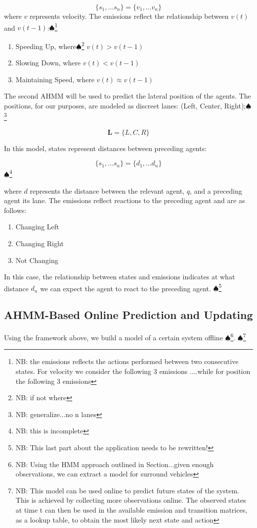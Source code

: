 \documentclass[letterpaper, 10 pt, conference]{ieeeconf}  %
\newcommand\NB[1]{$\spadesuit$\footnote{NB: #1}}
\begin{document}
\begin{equation}
\{s_1,\ldots s_n\} = \{v_1,\ldots v_n\}
\end{equation}
    where $v$ represents velocity. The emissions reflect the relationship between $v(t)$ and $v(t-1)$:\NB{the emissions reflects the actions performed between two consecutive states. For velocity we consider the following 3 emissions ....while for position the following 3 emissions }

\begin{enumerate}
    \item Speeding Up, where\NB{if not where} $v(t) > v(t-1)$
    \item Slowing Down, where $v(t) < v(t-1)$
    \item Maintaining Speed, where $v(t) \approx v(t-1)$
\end{enumerate}

The second AHMM will be used to predict the lateral position of the agents. The positions, for our purposes, are modeled as discreet lanes: (Left, Center, Right);\NB{generalize...no n lanes}

\begin{equation}
    \mathbf{L} = \{L,C,R\}
\end{equation}

In this model, states represent distances between preceding agents:

\begin{equation}
\{s_1,\ldots s_n\} = \{d_1,\ldots d_n\}
\end{equation}
\NB{this is incomplete}

where $d$ represents the distance between the relevant agent, $q$, and a preceding agent its lane. The emissions reflect reactions to the preceding agent and are as follows:
\begin{enumerate}
    \item Changing Left
    \item Changing Right
    \item Not Changing
\end{enumerate}
In this case, the relationship between states and emissions indicates at what distance $d_n$ we can expect the agent to react to the preceding agent.
\NB{This last part about the application needs to be rewritten!}

\subsection{AHMM-Based Online Prediction and Updating} \label{sec:ahmmpredupdate} %
 Using the framework above, we build a model of a certain system offline \NB{Using the HMM approach outlined in Section...given enough observations, we can extract a model for surround vehicles}. \NB{This model can be used online to predict future states of the system. This is achieved by collecting more observations online. The observed states at time t can then be used in the available emission and transition matrices, as a lookup table, to obtain the most likely next state and action}
\end{document}
